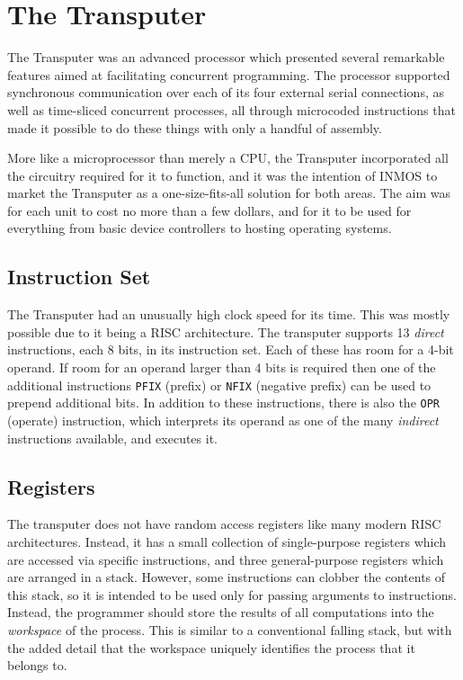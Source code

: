 \section{The Transputer}

The Transputer was an advanced processor which presented several remarkable
features aimed at facilitating concurrent programming. The processor supported
synchronous communication over each of its four external serial connections, as
well as time-sliced concurrent processes, all through microcoded instructions
that made it possible to do these things with only a handful of assembly.

More like a microprocessor than merely a CPU, the Transputer incorporated all
the circuitry required for it to function, and it was the intention of INMOS to
market the Transputer as a one-size-fits-all solution for both areas. The aim
was for each unit to cost no more than a few dollars, and for it to be used for
everything from basic device controllers to hosting operating systems.

\subsection{Instruction Set}

The Transputer had an unusually high clock speed for its time. This was mostly
possible due to it being a RISC architecture. The transputer supports 13
\textit{direct} instructions, each 8 bits, in its instruction set. Each of these
has room for a 4-bit operand. If room for an operand larger than 4 bits is
required then one of the additional instructions \texttt{PFIX} (prefix) or
\texttt{NFIX} (negative prefix) can be used to prepend additional bits. In
addition to these instructions, there is also the \texttt{OPR} (operate)
instruction, which interprets its operand as one of the many \textit{indirect}
instructions available, and executes it.

\subsection{Registers}

The transputer does not have random access registers like many modern RISC
architectures. Instead, it has a small collection of single-purpose registers
which are accessed via specific instructions, and three general-purpose
registers which are arranged in a stack. However, some instructions can clobber
the contents of this stack, so it is intended to be used only for passing
arguments to instructions. Instead, the programmer should store the results of
all computations into the \textit{workspace} of the process. This is similar to
a conventional falling stack, but with the added detail that the workspace
uniquely identifies the process that it belongs to.

